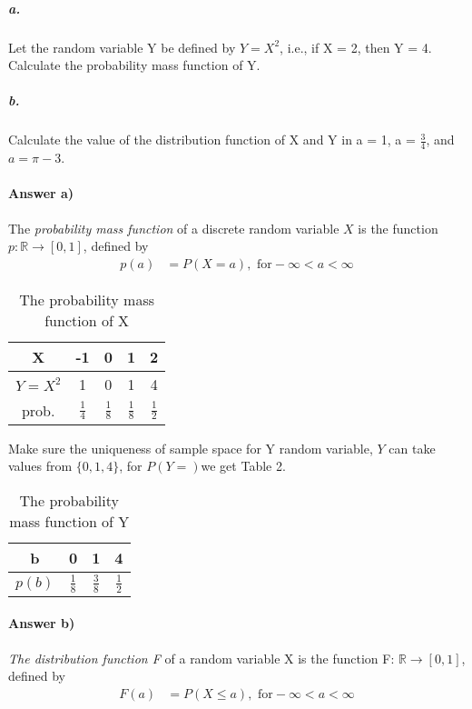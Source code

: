 \documentclass[11pt]{article} %
\begin{document}
\subparagraph*{a.} Let the random variable Y be defined by $Y=X^2$, i.e., if X = 2, then Y = 4. Calculate the probability mass function of Y. 
\subparagraph*{b.} Calculate the value of the distribution function of X and Y in a = 1, a = $\frac{3}{4}$, and $a=\pi - 3$. 

\paragraph*{\bf Answer a)}The {\em probability mass function} of a discrete random variable $X$ is the function $p: \mathbb{R} \rightarrow [0, 1]$, defined by
\begin{align*}
p(a) & = P(X=a), \text{ for}  -\infty < a < \infty
\end{align*} 

\begin{table}[h!]
\begin{center}
\begin{tabular}{c|cccc} \hline
X & -1 & 0 & 1 & 2 \\ \hline
$Y=X^2$ & 1 & 0 & 1 & 4 \\ \hline
prob. & $\frac{1}{4}$ & $\frac{1}{8}$ & $\frac{1}{8}$ & $\frac{1}{2}$ \\ \hline
\end{tabular}
\caption{The probability mass function of X}
\label{ta1}
\end{center}
\end{table}

Make sure the uniqueness of sample space for Y random variable, $Y$ can take values from $\{0,1,4\}$, for $P(Y=)$we get Table 2. 
\begin{table}[h!]
\begin{center}
\begin{tabular}{c|ccc} \hline
b & 0 & 1 & 4 \\ \hline
$p(b)$ & $\frac{1}{8}$ & $\frac{3}{8}$ & $\frac{1}{2}$ \\ \hline
\end{tabular}
\caption{The probability mass function of Y}
\label{ta1}
\end{center}
\end{table}

\paragraph*{\bf Answer b)} {\em The distribution function F} of a random variable X is the function F: $\mathbb{R} \rightarrow [0, 1]$, defined by
\begin{align*}
F(a) & = P(X\leq a), \text{ for}  -\infty < a < \infty
\end{align*} 
\end{document}
